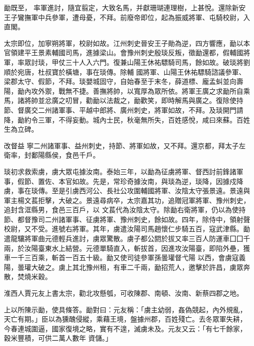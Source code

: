 \begin{pinyinscope}
 勔既至，
 率軍進討，隨宜翦定，大致名馬，并獻珊瑚連理樹，上甚悅。還除新安王子鸞撫軍中兵參軍，遭母憂，不拜。前廢帝即位，起為振威將軍、屯騎校尉，入直閣。



 太宗即位，加寧朔將軍，校尉如故。江州刺史晉安王子勛為逆，四方響應，勔以本官領建平王景素輔國司馬，進據梁山。會豫州刺史殷琰反叛，徵勔還都，假輔國將軍，率眾討琰，甲仗三十人入六門。復兼山陽王休祐驃騎司馬，餘如故。破琰將劉順於宛唐，杜叔寶於橫塘，事在琰傳。除輔
 國將軍、山陽王休祐驃騎諮議參軍、梁郡太守、假節，不拜。琰嬰城固守，自始春至于末冬，薛道標、龐孟虯並向壽陽，勔內攻外禦，戰無不捷。善撫將帥，以寬厚為眾所依。將軍王廣之求勔所自乘馬，諸將帥並忿廣之叨冒，勸勔以法裁之，勔歡笑，即時解馬與廣之。復除使持節、督廣交二州諸軍事、平越中郎將、廣州刺史，將軍如故，不拜。及琰開門請降，勔約令三軍，不得妄動。城內士民，秋毫無所失，百姓感悅，咸曰來蘇。百姓生為立碑。



 改督益
 寧二州諸軍事、益州刺史，持節、將軍如故，又不拜。還京都，拜太子左衛率，封鄱陽縣侯，食邑千戶。



 琰初求救索虜，虜大眾屯據汝南。泰始三年，以勔為征虜將軍、督西討前鋒諸軍事，假節、置佐、本官如故。先是，常珍奇據汝南，與琰為逆，琰降，因據戍降虜，事在琰傳。至是引虜西河公、長社公攻圍輔國將軍、汝陰太守張景遠。景遠與軍主楊文萇拒擊，大破之。景遠尋病卒，太宗嘉其功，追贈冠軍將軍、豫州刺史，追封含洭縣男，食邑三百戶，以
 文萇代為汝陰太守。除勔右衛將軍，仍以為使持節、都督豫司二州諸軍事、征虜將軍、豫州刺史，餘如故。四年，除侍中，領射聲校尉，又不受。進號右將軍。其年，虜遣汝陽司馬趙懷仁步騎五百，寇武津縣。勔遣龍驤將軍曲元德輕兵進討，虜眾驚散。虜子都公閼於拔又率三百人防運車囗囗千兩，於汝陽臺東水上結營。元德單騎直入，斬拔首，因進攻汝陽臺，即陷外壘，獲車一千三百乘，斬首一百五十級。勔又使司徒參軍孫曇瓘督弋陽
 以西，會虜寇義陽，曇瓘大破之。虜上其北豫州租，有車二千兩，勔招荒人，邀擊於許昌，虜眾奔散，焚燒米穀。



 淮西人賈元友上書太宗，勸北攻懸瓠，可收陳郡、南頓、汝南、新蔡四郡之地。



 上以所陳示勔，使具條答。勔對曰：元友稱：「虜主幼弱，姦偽競起，內外規亂，天亡有期。」臣以為獯醜侵縱，乘藉王境，盤據州郡，百姓殘亡。去冬眾軍失耕，今春連城圍逼，國家復境之略，實有不遑，滅虜未及。元友又云：「有七千餘家，穀米豐積，可供二萬人數年
 資儲。」




\end{pinyinscope}
